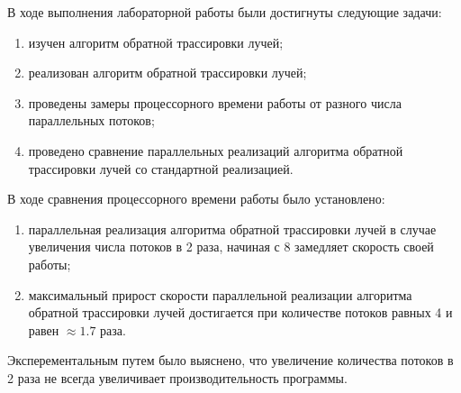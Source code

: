 \Conclusion
    В ходе выполнения лабораторной работы были достигнуты следующие задачи:
    \begin{enumerate}
        \item изучен алгоритм обратной трассировки лучей;
        \item реализован алгоритм обратной трассировки лучей;
        \item проведены замеры процессорного времени работы от разного числа параллельных потоков;
        \item проведено сравнение параллельных реализаций алгоритма обратной трассировки лучей со стандартной реализацией.
    \end{enumerate}

В ходе сравнения процессорного времени работы было установлено:
	\begin{enumerate}
	\item параллельная реализация алгоритма обратной трассировки лучей в случае увеличения числа потоков в 2 раза, начиная с 8 замедляет скорость своей работы;
	\item максимальный прирост скорости параллельной реализации алгоритма обратной трассировки лучей достигается при количестве потоков равных 4 и равен  $ \approx 1.7 $ раза.


        \end{enumerate}

Эксперементальным путем было выяснено, что увеличение количества потоков в 2 раза не всегда увеличивает производительность программы.

    


